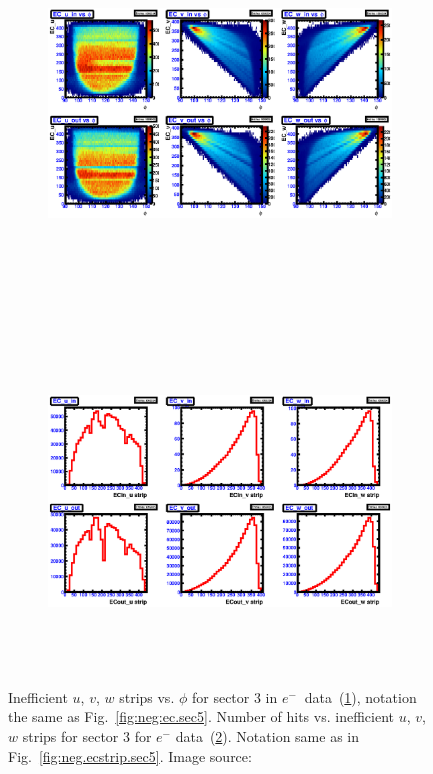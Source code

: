 %
\begin{figure}[htpb]
  \centering
  \begin{subfigure}[b]{\figwidth}
  \includegraphics[width=\figwidth, height=3.5in,valign=c]{figures/calib/ec/pim_ecuvw_phi_NOKnockout_sec3.eps}\caption{}\label{fig:EC_I_III}
  \end{subfigure}%
  \\
  \begin{subfigure}[b]{\figwidth}
  \includegraphics[width=\figwidth, height=3.5in,valign=c]{figures/calib/ec/pim_ecuvw_NOKnockout_sec3.eps}\caption{}\label{fig:EC_II_III}
  \end{subfigure}%
      \caption {Inefficient  $u$, $v$, $w$ strips vs. $\phi$ for sector 3 in  $e^{-} \ $ data~(\ref{fig:EC_I_III}), notation the same as Fig.~\ref{fig:neg:ec.sec5}. Number of hits vs. inefficient  $u$, $v$, $w$ strips for sector 3 for $e^-$ data~(\ref{fig:EC_II_III}). Notation same as in Fig.~\ref{fig:neg.ecstrip.sec5}. Image source:~\cite{clas.thesis.kunkel}}
        \label{fig:EC_no_III}
\end{figure}



